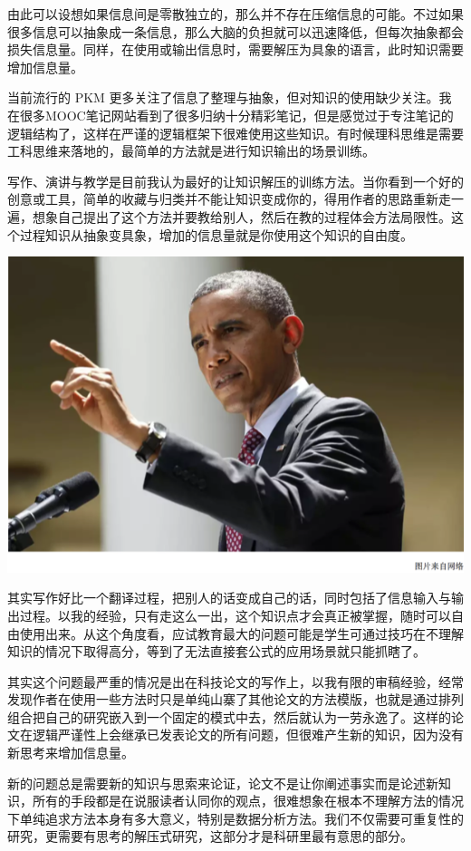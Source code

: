 \documentclass[]{book}
\begin{document}
由此可以设想如果信息间是零散独立的，那么并不存在压缩信息的可能。不过如果很多信息可以抽象成一条信息，那么大脑的负担就可以迅速降低，但每次抽象都会损失信息量。同样，在使用或输出信息时，需要解压为具象的语言，此时知识需要增加信息量。

当前流行的 PKM 更多关注了信息了整理与抽象，但对知识的使用缺少关注。我在很多MOOC笔记网站看到了很多归纳十分精彩笔记，但是感觉过于专注笔记的逻辑结构了，这样在严谨的逻辑框架下很难使用这些知识。有时候理科思维是需要工科思维来落地的，最简单的方法就是进行知识输出的场景训练。

写作、演讲与教学是目前我认为最好的让知识解压的训练方法。当你看到一个好的创意或工具，简单的收藏与归类并不能让知识变成你的，得用作者的思路重新走一遍，想象自己提出了这个方法并要教给别人，然后在教的过程体会方法局限性。这个过程知识从抽象变具象，增加的信息量就是你使用这个知识的自由度。

\includegraphics[width=8.33in]{images/gtd3}

其实写作好比一个翻译过程，把别人的话变成自己的话，同时包括了信息输入与输出过程。以我的经验，只有走这么一出，这个知识点才会真正被掌握，随时可以自由使用出来。从这个角度看，应试教育最大的问题可能是学生可通过技巧在不理解知识的情况下取得高分，等到了无法直接套公式的应用场景就只能抓瞎了。

其实这个问题最严重的情况是出在科技论文的写作上，以我有限的审稿经验，经常发现作者在使用一些方法时只是单纯山寨了其他论文的方法模版，也就是通过排列组合把自己的研究嵌入到一个固定的模式中去，然后就认为一劳永逸了。这样的论文在逻辑严谨性上会继承已发表论文的所有问题，但很难产生新的知识，因为没有新思考来增加信息量。

新的问题总是需要新的知识与思索来论证，论文不是让你阐述事实而是论述新知识，所有的手段都是在说服读者认同你的观点，很难想象在根本不理解方法的情况下单纯追求方法本身有多大意义，特别是数据分析方法。我们不仅需要可重复性的研究，更需要有思考的解压式研究，这部分才是科研里最有意思的部分。
\end{document}
